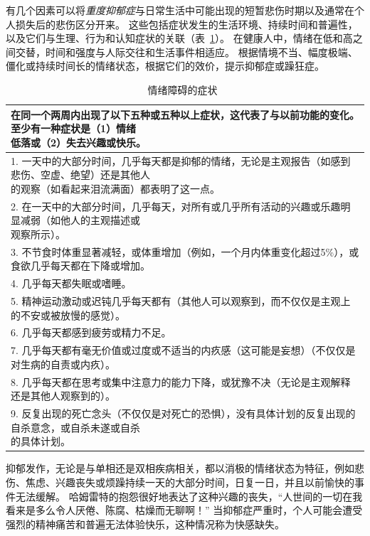 有几个因素可以将\textit{重度抑郁症}与日常生活中可能出现的短暂悲伤时期以及通常在个人损失后的悲伤区分开来。
这些包括症状发生的生活环境、持续时间和普遍性，以及它们与生理、行为和认知症状的关联（表~\ref{tab:61_1}）。
在健康人中，情绪在低和高之间交替，时间和强度与人际交往和生活事件相适应。
根据情境不当、幅度极端、僵化或持续时间长的情绪状态，根据它们的效价，提示抑郁症或躁狂症。


\begin{table}[htbp]
	\caption{情绪障碍的症状~\cite{vahia2013diagnostic} \label{tab:61_1}}
	\begin{tabular}{l}
		\toprule
		\makecell[l]{在同一个两周内出现了以下五种或五种以上症状，这代表了与以前功能的变化。
		至少有一种症状是（1）情绪 \\低落或（2）失去兴趣或快乐。} \\
		\midrule
		\makecell[l]{1. 一天中的大部分时间，几乎每天都是抑郁的情绪，无论是主观报告（如感到悲伤、空虚、绝望）还是其他人\\的观察（如看起来泪流满面）都表明了这一点。}\\
		\makecell[l]{2. 在一天中的大部分时间，几乎每天，对所有或几乎所有活动的兴趣或乐趣明显减弱（如他人的主观描述或\\观察所示）。}\\
		3. 不节食时体重显著减轻，或体重增加（例如，一个月内体重变化超过5\%），或食欲几乎每天都在下降或增加。\\
		4. 几乎每天都失眠或嗜睡。\\
		5. 精神运动激动或迟钝几乎每天都有（其他人可以观察到，而不仅仅是主观上的不安或被放慢的感觉）。  \\
		6. 几乎每天都感到疲劳或精力不足。\\
		7. 几乎每天都有毫无价值或过度或不适当的内疚感（这可能是妄想）（不仅仅是对生病的自责或内疚）。\\
		8. 几乎每天都在思考或集中注意力的能力下降，或犹豫不决（无论是主观解释还是其他人观察到的）。\\
		\makecell[l]{9. 反复出现的死亡念头（不仅仅是对死亡的恐惧），没有具体计划的反复出现的自杀意念，或自杀未遂或自杀\\的具体计划。} \\
		\bottomrule
	\end{tabular}
\end{table}


抑郁发作，无论是与单相还是双相疾病相关，都以消极的情绪状态为特征，例如悲伤、焦虑、兴趣丧失或烦躁持续一天的大部分时间，日复一日，并且以前愉快的事件无法缓解。
哈姆雷特的抱怨很好地表达了这种兴趣的丧失，“人世间的一切在我看来是多么令人厌倦、陈腐、枯燥而无聊啊！” 
当抑郁症严重时，个人可能会遭受强烈的精神痛苦和普遍无法体验快乐，这种情况称为快感缺失。


